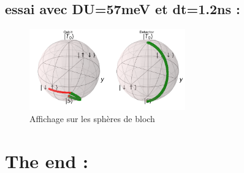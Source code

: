 \documentclass{article}
\begin{document}
\subsection{essai avec DU=57meV et dt=1.2ns :}
\begin{figure}[H]
  \centering
  \vspace{0.8em}
    \includegraphics[width=0.6\textwidth]{singlet-triplet_du_57_dt_1_2_version1.png}
  \caption{Affichage sur les sphères de bloch}
  \label{fig:fidelity_map_detector}
\end{figure}


\section{The end :}
\end{document}
